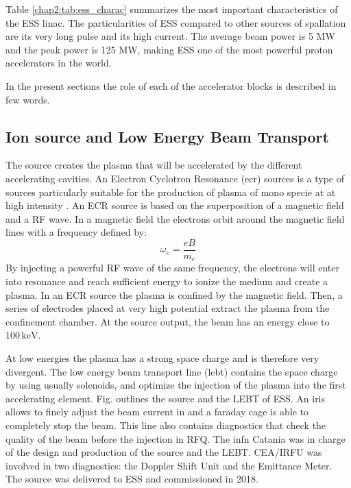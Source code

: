 \begin{refsection}
  

  Table \ref{chap2:tab:ess_charac} summarizes the most important characteristics of the ESS linac. The particularities of ESS compared to other sources of spallation are its very long pulse and its high current. The average beam power is 5 MW and the peak power is 125 MW, making ESS one of the most powerful proton accelerators in the world.

  

  In the present sections the role of each of the accelerator blocks is described in few words.

  \subsection{Ion source and Low Energy Beam Transport}
  The source creates the plasma that will be accelerated by the different accelerating cavities. An Electron Cyclotron Resonance (\acrshort{ecr}) sources is a type of sources particularly suitable for the production of plasma of mono specie at at high intensity \cite{nicke2012}. An ECR source is based on the superposition of a magnetic field and a RF wave. In a magnetic field the electrons orbit around the magnetic field lines with a frequency defined by:
  \begin{equation}
    \omega_{e} = \frac{eB}{m_{e}}
  \end{equation}
  By injecting a powerful RF wave of the same frequency, the electrons will enter into resonance and reach sufficient energy to ionize the medium and create a plasma. In an ECR source the plasma is confined by the magnetic field. Then, a series of electrodes placed at very high potential extract the plasma from the confinement chamber. At the source output, the beam has an energy close to $100\,\mathrm{keV}$.

  At low energies the plasma has a strong space charge and is therefore very divergent. The low energy beam transport line (\acrshort{lebt}) contains the space charge by using usually solenoids, and optimize the injection of the plasma into the first accelerating element.
  Fig. outlines the source and the LEBT of ESS. An iris allows to finely adjust the beam current in and a faraday cage is able to completely stop the beam. This line also contains diagnostics that check the quality of the beam before the injection in RFQ. The \acrshort{infn} Catania was in charge of the design and production of the source and the LEBT. CEA/IRFU was involved in two diagnostics: the Doppler Shift Unit \cite{Thomas:IPAC2017-MOPVA037} and the Emittance Meter\cite{Tuske:IPAC2017-MOPAB023}. The source was delivered to ESS and commissioned in 2018.
  

\end{refsection}
